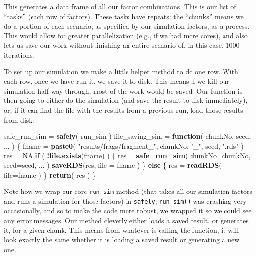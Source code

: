 \documentclass[
]{book}
\newenvironment{Shaded}{\begin{snugshade}}{\end{snugshade}}
\newcommand{\AttributeTok}[1]{\textcolor[rgb]{0.13,0.29,0.53}{#1}}
\newcommand{\ConstantTok}[1]{\textcolor[rgb]{0.56,0.35,0.01}{#1}}
\newcommand{\ControlFlowTok}[1]{\textcolor[rgb]{0.13,0.29,0.53}{\textbf{#1}}}
\newcommand{\FunctionTok}[1]{\textcolor[rgb]{0.13,0.29,0.53}{\textbf{#1}}}
\newcommand{\NormalTok}[1]{#1}
\newcommand{\OtherTok}[1]{\textcolor[rgb]{0.56,0.35,0.01}{#1}}
\newcommand{\SpecialCharTok}[1]{\textcolor[rgb]{0.81,0.36,0.00}{\textbf{#1}}}
\newcommand{\StringTok}[1]{\textcolor[rgb]{0.31,0.60,0.02}{#1}}
\begin{document}
This generates a data frame of all our factor combinations.
This is our list of ``tasks'' (each row of factors).
These tasks have repeats: the ``chunks'' means we do a portion of each scenario, as specified by our simulation factors, as a process.
This would allow for greater parallelization (e.g., if we had more cores), and also lets us save our work without finishing an entire scenario of, in this case, 1000 iterations.

To set up our simulation we make a little helper method to do one row.
With each row, once we have run it, we save it to disk.
This means if we kill our simulation half-way through, most of the work would be saved.
Our function is then going to either do the simulation (and save the result to disk immediately), or, if it can find the file with the results from a previous run, load those results from disk:

\begin{Shaded}
\begin{Highlighting}[]
\NormalTok{safe\_run\_sim }\OtherTok{=} \FunctionTok{safely}\NormalTok{( run\_sim )}
\NormalTok{file\_saving\_sim }\OtherTok{=} \ControlFlowTok{function}\NormalTok{( chunkNo, seed, ... ) \{}
\NormalTok{    fname }\OtherTok{=} \FunctionTok{paste0}\NormalTok{( }\StringTok{"results/frags/fragment\_"}\NormalTok{, chunkNo, }\StringTok{"\_"}\NormalTok{, seed, }\StringTok{".rds"}\NormalTok{ )}
\NormalTok{    res }\OtherTok{=} \ConstantTok{NA}
    \ControlFlowTok{if}\NormalTok{ ( }\SpecialCharTok{!}\FunctionTok{file.exists}\NormalTok{(fname) ) \{}
\NormalTok{        res }\OtherTok{=} \FunctionTok{safe\_run\_sim}\NormalTok{( }\AttributeTok{chunkNo=}\NormalTok{chunkNo, }\AttributeTok{seed=}\NormalTok{seed, ... )}
        \FunctionTok{saveRDS}\NormalTok{(res, }\AttributeTok{file =}\NormalTok{ fname )}
\NormalTok{    \} }\ControlFlowTok{else}\NormalTok{ \{}
\NormalTok{        res }\OtherTok{=} \FunctionTok{readRDS}\NormalTok{( }\AttributeTok{file=}\NormalTok{fname )}
\NormalTok{    \}}
    \FunctionTok{return}\NormalTok{( res )}
\NormalTok{\}}
\end{Highlighting}
\end{Shaded}

Note how we wrap our core \texttt{run\_sim} method (that takes all our simulation factors and runs a simulation for those factors) in \texttt{safely}; \texttt{run\_sim()} was crashing very occasionally, and so to make the code more robust, we wrapped it so we could see any error messages.
Our method cleverly either loads a saved result, or generates it, for a given chunk.
This means from whatever is calling the function, it will look exactly the same whether it is loading a saved result or generating a new one.
\end{document}
